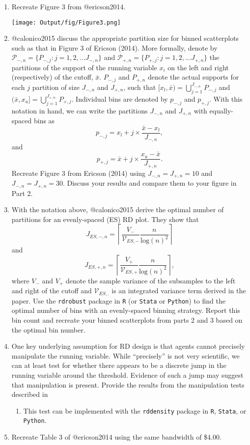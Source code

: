 \documentclass[
  12pt,
]{article}
\providecommand{\tightlist}{%
  \setlength{\itemsep}{0pt}\setlength{\parskip}{0pt}}
\begin{document}
\begin{enumerate}
\def\labelenumi{\arabic{enumi}.}
\setcounter{enumi}{1}
\item
  Recreate Figure 3 from @ericson2014.

  \texttt{[image: Output/fig/Figure3.png]}
\item
  @calonico2015 discuss the appropriate partition size for binned
  scatterplots such as that in Figure 3 of Ericson (2014). More
  formally, denote by
  \(\mathcal{P}_{-,n} = \{ P_{-,j} : j=1, 2, ... J_{-, n} \}\) and
  \(\mathcal{P}_{+,n} = \{ P_{+,j} : j=1, 2, ... J_{+, n} \}\) the
  partitions of the support of the running variable \(x_{i}\) on the
  left and right (respectively) of the cutoff, \(\bar{x}\). \(P_{-, j}\)
  and \(P_{+, n}\) denote the actual supports for each \(j\) partition
  of size \(J_{-,n}\) and \(J_{+,n}\), such that
  \([x_{l}, \bar{x}) = \bigcup_{j=1}^{J_{-,n}} P_{-, j}\) and
  \((\bar{x}, x_{u}] = \bigcup_{j=1}^{J_{+,n}} P_{+, j}\). Individual
  bins are denoted by \(p_{-,j}\) and \(p_{+,j}\). With this notation in
  hand, we can write the partitions \(J_{-,n}\) and \(J_{+,n}\) with
  equally-spaced bins as
  \[p_{-,j}=x_{l} + j \times \frac{\bar{x} - x_{l}}{J_{-,n}},\] and
  \[p_{+,j} = \bar{x} + j \times \frac{x_{u} - \bar{x}}{J_{+,n}}.\]
  Recreate Figure 3 from Ericson (2014) using \(J_{-,n}=J_{+,n}=10\) and
  \(J_{-,n}=J_{+,n}=30\). Discuss your results and compare them to your
  figure in Part 2.
\item
  With the notation above, @calonico2015 derive the optimal number of
  partitions for an evenly-spaced (ES) RD plot. They show that
  \[J_{ES,-,n} = \left\lceil \frac{V_{-}}{\mathcal{V}_{ES,-}} \frac{n}{\text{log}(n)^{2}} \right\rceil\]
  and
  \[J_{ES,+,n} = \left\lceil \frac{V_{+}}{\mathcal{V}_{ES,+}} \frac{n}{\text{log}(n)^{2}} \right\rceil,\]
  where \(V_{-}\) and \(V_{+}\) denote the sample variance of the
  subsamples to the left and right of the cutoff and
  \(\mathcal{V}_{ES,.}\) is an integrated variance term derived in the
  paper. Use the \texttt{rdrobust} package in \texttt{R} (or
  \texttt{Stata} or \texttt{Python}) to find the optimal number of bins
  with an evenly-spaced binning strategy. Report this bin count and
  recreate your binned scatterplots from parts 2 and 3 based on the
  optimal bin number.
\item
  One key underlying assumption for RD design is that agents cannot
  precisely manipulate the running variable. While ``precisely'' is not
  very scientific, we can at least test for whether there appears to be
  a discrete jump in the running variable around the threshold. Evidence
  of such a jump may suggest that manipulation is present. Provide the
  results from the manipulation tests described in

  \begin{enumerate}
  \def\labelenumii{\arabic{enumii}.}
  \tightlist
  \item
    This test can be implemented with the \texttt{rddensity} package in
    \texttt{R}, \texttt{Stata}, or \texttt{Python}.
  \end{enumerate}
\item
  Recreate Table 3 of @ericson2014 using the same bandwidth of \$4.00.
\end{enumerate}
\end{document}
